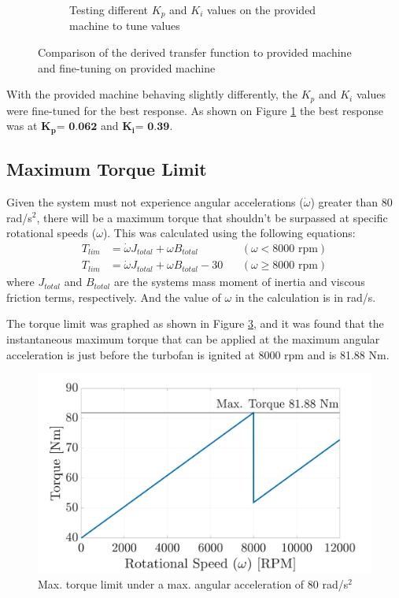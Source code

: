 \begin{figure}[tbh!]
\begin{subfigure}{0.54\textwidth}
                 \caption{Testing different \(K_p\) and \(K_i\) values on the provided machine to tune values}
                 \label{fig: settling time test}
             \end{subfigure}
             \caption{Comparison of the derived transfer function to provided machine and fine-tuning on provided machine}
             \label{fig: comparison of current}
        \end{figure}
        With the provided machine behaving slightly differently, the \(K_p\) and \(K_i\) values were fine-tuned for the best response. As shown on Figure \ref{fig: settling time test} the best response was at \(\textbf{K}_\textbf{p} \textbf{= 0.062}\) and \(\textbf{K}_\textbf{i} \textbf{= 0.39}\).

    \subsection{Maximum Torque Limit}
        Given the system must not experience angular accelerations (\(\dot \omega\)) greater than 80 rad/s\(^2\), there will be a maximum torque that shouldn't be surpassed at specific rotational speeds (\(\omega\)). This was calculated using the following equations:
        \begin{align}
            T_{lim} &= \dot \omega J_{total} + \omega B_{total} \:\:\:\: &(\omega < 8000 \text{ rpm}) \\
            T_{lim} &= \dot \omega J_{total} + \omega B_{total} - 30 \:\:\:\: &(\omega \geq 8000 \text{ rpm})
        \end{align}
        where \(J_{total}\) and \(B_{total}\) are the systems mass moment of inertia and viscous friction terms, respectively. And the value of \(\omega\) in the calculation is in rad/s.

        The torque limit was graphed as shown in Figure \ref{fig: max torque}, and it was found that the instantaneous maximum torque that can be applied at the maximum angular acceleration is just before the turbofan is ignited at 8000 rpm and is 81.88 Nm.
        \begin{figure}[tbh!]
            \centering
            \includegraphics[width=0.6\linewidth]{PEMDT Exam Report/img/max torque.jpg}
            \caption{Max. torque limit under a max. angular acceleration of 80 rad/s\(^2\)}
            \label{fig: max torque}
        \end{figure}

